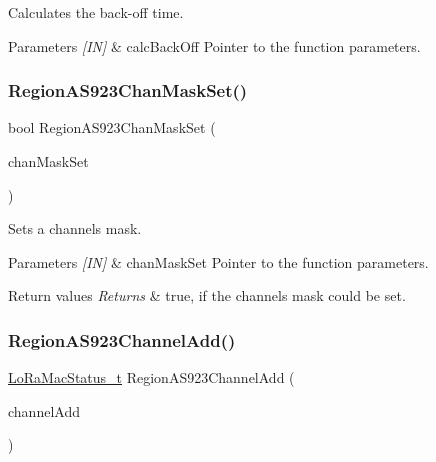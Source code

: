Calculates the back-\/off time. 


\begin{DoxyParams}{Parameters}
{\em \mbox{[}\+I\+N\mbox{]}} & calc\+Back\+Off Pointer to the function parameters. \\
\hline
\end{DoxyParams}
\mbox{\label{group__REGIONAS923_gab493d29d1037f6b6f47baf0cfc2faf47}} 
\subsubsection{\texorpdfstring{Region\+A\+S923\+Chan\+Mask\+Set()}{RegionAS923ChanMaskSet()}}
{\footnotesize\ttfamily bool Region\+A\+S923\+Chan\+Mask\+Set (\begin{DoxyParamCaption}\item[{\hyperlink{group__REGION_ga6d24f7da136006410827dfb29f6b9b9e}{Chan\+Mask\+Set\+Params\+\_\+t} $\ast$}]{chan\+Mask\+Set }\end{DoxyParamCaption})}



Sets a channels mask. 


\begin{DoxyParams}{Parameters}
{\em \mbox{[}\+I\+N\mbox{]}} & chan\+Mask\+Set Pointer to the function parameters.\\
\hline
\end{DoxyParams}

\begin{DoxyRetVals}{Return values}
{\em Returns} & true, if the channels mask could be set. \\
\hline
\end{DoxyRetVals}
\mbox{\label{group__REGIONAS923_ga7477b7737c48e88f1d82a7ef70eb7b56}} 
\subsubsection{\texorpdfstring{Region\+A\+S923\+Channel\+Add()}{RegionAS923ChannelAdd()}}
{\footnotesize\ttfamily \hyperlink{group__LORAMAC_ga30bd25657e10480f8605ee951b0ecfbd}{Lo\+Ra\+Mac\+Status\+\_\+t} Region\+A\+S923\+Channel\+Add (\begin{DoxyParamCaption}\item[{\hyperlink{group__REGION_gab1c5f3aa06614283202906cef4417860}{Channel\+Add\+Params\+\_\+t} $\ast$}]{channel\+Add }\end{DoxyParamCaption})}



